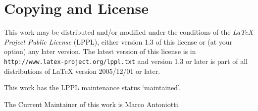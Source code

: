 \documentclass[10pt,fleqn]{article}
\begin{document}
\section{Copying and License}

This work may be distributed and/or modified under the conditions of
the \emph{LaTeX Project Public License} (LPPL), either version 1.3 of
this license or (at your option) any later version. The latest version
of this license is in \texttt{http://www.latex-project.org/lppl.txt}
and version 1.3 or later is part of all distributions of LaTeX version
2005/12/01 or later.

\noindent
This work has the LPPL maintenance status `maintained'.

\noindent
The Current Maintainer of this work is Marco Antoniotti.

\printindex
\end{document}
